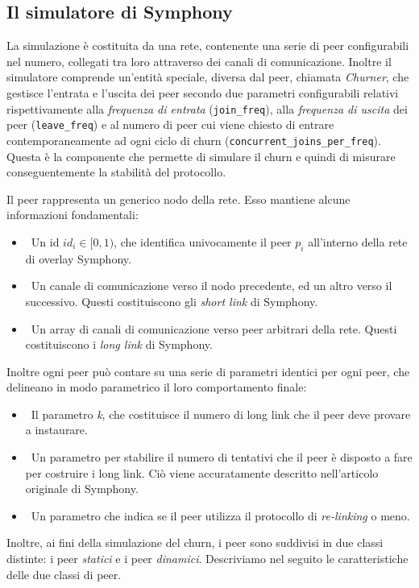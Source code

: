 \documentclass[prodmode,acmtap]{acmlarge}
\begin{document}
\subsection{Il simulatore di Symphony}

La simulazione è costituita da una rete, contenente una serie di peer configurabili nel numero, collegati tra loro attraverso dei canali di comunicazione. Inoltre il simulatore comprende un'entità speciale, diversa dal peer, chiamata \emph{Churner}, che gestisce l'entrata e l'uscita dei peer secondo due parametri configurabili relativi rispettivamente alla \emph{frequenza di entrata} (\texttt{join\_freq}), alla \emph{frequenza di uscita} dei peer (\texttt{leave\_freq}) e al numero di peer cui viene chiesto di entrare contemporaneamente ad ogni ciclo di churn (\texttt{concurrent\_joins\_per\_freq}). Questa è la componente che permette di simulare il churn e quindi di misurare conseguentemente la stabilità del protocollo.

Il peer rappresenta un generico nodo della rete. Esso mantiene alcune informazioni fondamentali:
\begin{itemize}
	\item ~Un id $id_i \in [0,1)$, che identifica univocamente il peer $p_i$ all'interno della rete di overlay Symphony.
	\item ~Un canale di comunicazione verso il nodo precedente, ed un altro verso il successivo. Questi costituiscono gli \textit{short link} di Symphony.
	\item ~Un array di canali di comunicazione verso peer arbitrari della rete. Questi costituiscono i \textit{long link} di Symphony.
\end{itemize}

Inoltre ogni peer può contare su una serie di parametri identici per ogni peer, che delineano in modo parametrico il loro comportamento finale:
\begin{itemize}
	\item ~Il parametro \textit{k}, che costituisce il numero di long link che il peer deve provare a instaurare.
	\item ~Un parametro per stabilire il numero di tentativi che il peer è disposto a fare per costruire i long link. Ciò viene accuratamente descritto nell'articolo originale di Symphony.
	\item ~Un parametro che indica se il peer utilizza il protocollo di \emph{re-linking} o meno.
\end{itemize}

Inoltre, ai fini della simulazione del churn, i peer sono suddivisi in due classi distinte: i peer \emph{statici} e i peer \emph{dinamici}. Descriviamo nel seguito le caratteristiche delle due classi di peer.
\end{document}
